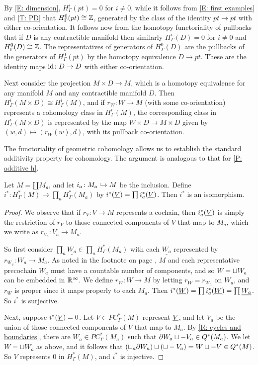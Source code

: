 \begin{example}\label{E: contractible}
By \cref{E: dimension}, $H^i_\Gamma(pt)=0$ for $i\neq 0$, while it follows from \cref{E: first examples} and \cref{T: PD} that  $H^0_\Gamma(pt) \cong \mathbb{Z}$, generated by the class of the identity $pt \to pt$ with either co-orientation.
It follows now from the homotopy functoriality of pullbacks that if $D$ is any contractible manifold then similarly $H^i_\Gamma(D)=0$ for $i\neq 0$ and $H^0_\Gamma(D) \cong \mathbb{Z}$.
The representatives of generators of $H^0_\Gamma(D)$ are the pullbacks of the generators of $H^0_\Gamma(pt)$ by the homotopy equivalence $D \to pt$.
These are the identity maps $\mathrm{id} \colon D \to D$ with either co-orientation.

Next consider the projection $M \times D \to M$, which is a homotopy equivalence for any manifold $M$ and any contractible manifold $D$.
Then $H^i_\Gamma(M \times D) \cong H^i_\Gamma(M)$, and if $r_W \colon W \to M$ (with some co-orientation) represents a cohomology class in $H^i_\Gamma(M)$, the corresponding class in $H^i_\Gamma(M \times D)$ is represented by the map $W \times D \to M \times D$ given by $(w,d) \mapsto (r_W(w),d)$, with its pullback co-orientation.
\end{example}

The functoriality of geometric cohomology allows us to establish the standard additivity property for cohomology.
The argument is analogous to that for \cref{P: additive h}.

\begin{proposition}\label{P: additive c}
Let $M = \amalg{M_a}$, and let $i_a \colon M_a \hookrightarrow M$ be the inclusion.
Define $i^* \colon H^*_\Gamma(M) \to \prod_a H^*_\Gamma(M_a)$ by $i^*(\underline{V}) = \prod i^*_a(\underline{V})$.
Then $i^*$ is an isomorphism.
\end{proposition}
\begin{proof}
We observe that if $r_V \colon V \to M$ represents a cochain, then $i^*_a(\underline{V})$ is simply the restriction of $r_V$ to those connected components of $V$ that map to $M_a$, which we write as $r_{V_a} \colon V_a \to M_a$.


So first consider $\prod_a \underline{W_a} \in \prod_a H^*_\Gamma(M_a)$ with each $\underline{W_a}$ represented by $r_{W_a} \colon W_a \to M_a$.
As noted in the footnote on page \pageref{F: countable}, $M$ and each representative precochain $W_a$ must have a countable number of components, and so $W = \sqcup W_a$ can be embedded in $\mathbb{R}^\infty$.
We define $r_W \colon W \to M$ by letting $r_W = r_{W_a}$ on $W_a$, and $r_W$ is proper since it maps properly to each $M_a$.
Then $i^*(\underline{W}) = \prod i^*_a(\underline{W}) = \prod \underline{W_a}$.
So $i^*$ is surjective.

Next, suppose $i^*(\underline{V}) = 0$.
Let $V \in PC^*_\Gamma(M)$ represent $\underline{V}$, and let $V_a$ be the union of those connected components of $V$ that map to $M_a$.
By \cref{R: cycles and boundaries}, there are $W_a \in PC^*_\Gamma(M_a)$ such that $\partial W_a \sqcup -V_a \in Q^*(M_a)$.
We let $W = \sqcup W_a$ as above, and it follows that $(\sqcup_a \partial W_a) \sqcup (\sqcup -V_a) = W \sqcup -V \in Q^*(M)$.
So $V$ represents $0$ in $H^*_\Gamma(M)$, and $i^*$ is injective.
\end{proof}


